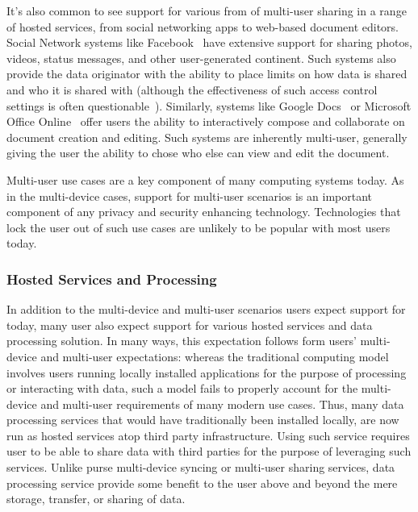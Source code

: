 It's also common to see support for various from of multi-user sharing
in a range of hosted services, from social networking apps to
web-based document editors. Social Network systems like
Facebook~\cite{facebook} have extensive support for sharing photos,
videos, status messages, and other user-generated continent. Such
systems also provide the data originator with the ability to place
limits on how data is shared and who it is shared with (although the
effectiveness of such access control settings is often
questionable~\cite{Johnson2012}). Similarly, systems like Google
Docs~\cite{google-docs} or Microsoft Office
Online~\cite{microsoft-officeonline} offer users the ability to
interactively compose and collaborate on document creation and
editing. Such systems are inherently multi-user, generally giving the
user the ability to chose who else can view and edit the document.

Multi-user use cases are a key component of many computing systems
today. As in the multi-device cases, support for multi-user scenarios
is an important component of any privacy and security enhancing
technology. Technologies that lock the user out of such use cases are
unlikely to be popular with most users today.

\subsubsection{Hosted Services and Processing}

In addition to the multi-device and multi-user scenarios users expect
support for today, many user also expect support for various hosted
services and data processing solution. In many ways, this expectation
follows form users' multi-device and multi-user expectations: whereas
the traditional computing model involves users running locally
installed applications for the purpose of processing or interacting
with data, such a model fails to properly account for the multi-device
and multi-user requirements of many modern use cases. Thus, many data
processing services that would have traditionally been installed
locally, are now run as hosted services atop third party
infrastructure. Using such service requires user to be able to share
data with third parties for the purpose of leveraging such
services. Unlike purse multi-device syncing or multi-user sharing
services, data processing service provide some benefit to the user
above and beyond the mere storage, transfer, or sharing of data.

